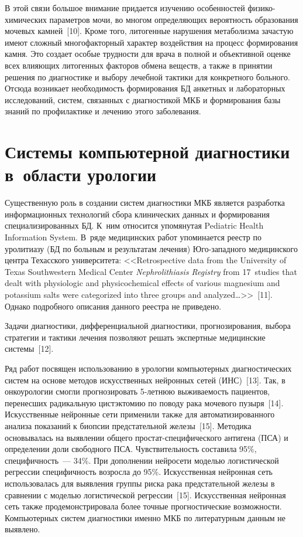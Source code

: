 \begin{multicols}{2}
{}
      
      В этой связи большое внимание придается изуче\-нию особенностей фи\-зи\-ко-хи\-ми\-че\-ских 
па\-ра\-мет\-ров мочи, во многом определяющих вероятность образования мочевых камней~[10]. Кроме 
того, литогенные нарушения метаболизма зачастую имеют сложный многофакторный 
характер воздействия на процесс формирования камня. Это создает особые трудности для 
врача в полной и объективной оценке всех влияющих литогенных факторов обмена веществ, а 
также в принятии решения по диагностике и выбору лечебной тактики для конкретного 
больного. Отсюда возникает необходимость формирования БД анкетных и 
лабораторных исследований, систем, связанных с диагностикой МКБ и формирования базы 
знаний по профилактике и лечению этого заболевания.
      
\section{Системы компьютерной диагностики в~области урологии}

      Существенную роль в создании систем диагностики МКБ является разработка 
информационных технологий сбора клинических данных и формирования 
специализированных БД. К~ним относится упомянутая Pediatric Health Information 
System. В~ряде медицинских работ упоминается реестр по уролитиазу (БД по 
больным и результатам лечения) Юго-за\-пад\-но\-го медицинского центра Техасского 
университета: <<Retrospective data from the University of Texas Southwestern Medical Center 
\textit{Nephrolithiasis Registry} from 17~studies that dealt with physiologic and physicochemical 
effects of various magnesium and potassium salts were categorized into three groups and 
analyzed\ldots>>~[11]. Однако подробного описания данного реестра не приведено. 
      
      Задачи диагностики, дифференциальной диагностики, прогнозирования, выбора 
стратегии и тактики лечения позволяют решать экспертные медицинские системы~[12].
      
      Ряд работ посвящен использованию в урологии компьютерных диагностических систем 
на основе методов искусственных нейронных сетей (ИНС)~[13].
 Так, в онкоурологии смогли 
прогнозировать 5-лет\-нюю выживаемость пациентов, перенесших радикальную цистэктомию 
по поводу\linebreak
рака мочевого пузы\-ря~[14]. Искусственные ней\-ронные сети применили также для 
автоматизи\-рованного анализа показаний к биопсии предстательной железы~[15]. 
Методика основывалась на\linebreak 
выявлении общего прос\-тат-спе\-ци\-фи\-че\-ско\-го антигена (ПСА) и определении доли 
свободного ПСА. Чувствительность составила 95\%, специфичность~--- 34\%. При 
дополне\-нии нейросети моделью логистической регрессии специфичность возросла до 95\%. 
Искусственная нейронная сеть использовалась для выявле\-ния группы риска рака предстательной железы в сравнении с 
моделью логистической регрессии~[15]. Искусственная нейронная сеть так\-же 
продемонстрировала более точные 
прогностические возможности. Компьютерных систем диагностики именно МКБ по 
литературным данным не выявлено.
{ %

}
\end{multicols}
